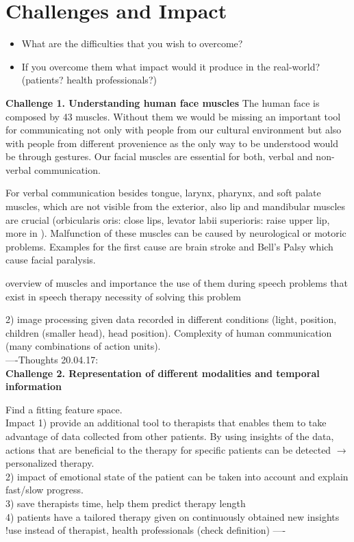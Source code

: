 \section{Challenges and Impact}

\begin{itemize}
    \item What are the difficulties that you wish to overcome?
    \item If you overcome them what impact would it produce in the real-world? (patients? health professionals?)
\end{itemize}

\textbf{Challenge 1. Understanding human face muscles}
The human face is composed by 43 muscles. Without them we would be missing an important tool for communicating not only with people from our cultural environment but also with people from different provenience as the only way to be understood would be through gestures. Our facial muscles are essential for both, verbal and non-verbal communication.\par 
For verbal communication besides tongue, larynx, pharynx, and soft palate muscles, which are not visible from the exterior, also lip and mandibular muscles are crucial (orbicularis oris: close lips, levator labii superioris: raise upper lip, more in \cite{PhonManual}). 
Malfunction of these muscles can be caused by neurological or motoric problems. Examples for the first cause are brain stroke and Bell's Palsy which cause facial paralysis.

overview of muscles and importance
the use of them during speech
problems that exist in speech therapy
necessity of solving this problem

2) image processing given data recorded in different conditions (light, position, children (smaller head), head position). Complexity of human communication (many combinations of action units).\\


----Thoughts 20.04.17:\\
\textbf{Challenge 2. Representation of different modalities and temporal information}

Find a fitting feature space. \\


Impact 1) provide an additional tool to therapists that enables them to take advantage of data collected from other patients. By using insights of the data, actions that are beneficial to the therapy for specific patients can be detected $\rightarrow$ personalized therapy.\\
2) impact of emotional state of the patient can be taken into account and explain fast/slow progress.\\
3) save therapists time, help them predict therapy length\\
4) patients have a tailored therapy given on continuously obtained new insights\\ 
!use instead of therapist, health professionals (check definition)
----\\



